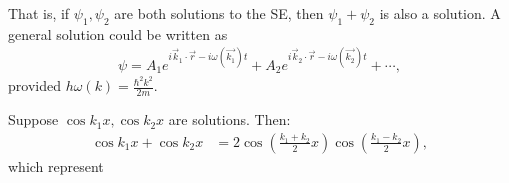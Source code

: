 \documentclass{article}
\numberwithin{equation}{section}
\begin{document}
That is, if $\psi_1,\psi_2$ are both solutions to the SE, then $\psi_1+\psi_2$ is also a solution. A general solution could be written as
\begin{align*}
    \psi = A_1e^{i\vec{k}_1 \cdot \vec{r} - i\omega(\vec{k_1})t} + A_2e^{i\vec{k}_2 \cdot \vec{r} - i\omega(\vec{k_2})t} + \cdots,
\end{align*}
provided $h\omega(k) = \frac{\hbar^2k^2}{2m}.$
\begin{example}
    Suppose $\cos k_1x,\cos k_2x$ are solutions. Then:
    \begin{align*}
        \cos k_1x + \cos k_2 x &= 2\cos\left(\frac{k_1+k_2}{2}x\right)\cos\left(\frac{k_1-k_2}{2}x\right),
    \end{align*}
    which represent 
    \begin{center}
    \end{center}
\end{example}
\end{document}
